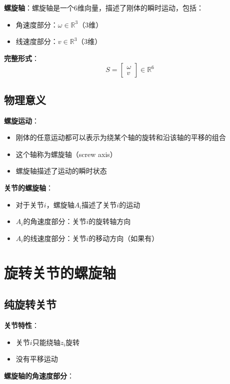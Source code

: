 \documentclass[12pt,a4paper]{article}
\begin{document}
\textbf{螺旋轴}：螺旋轴是一个6维向量，描述了刚体的瞬时运动，包括：
\begin{itemize}
\item 角速度部分：$\omega \in \mathbb{R}^3$（3维）
\item 线速度部分：$v \in \mathbb{R}^3$（3维）
\end{itemize}

\textbf{完整形式}：
\begin{equation}
S = \begin{bmatrix} \omega \\ v \end{bmatrix} \in \mathbb{R}^6
\end{equation}

\subsection{物理意义}

\textbf{螺旋运动}：
\begin{itemize}
\item 刚体的任意运动都可以表示为绕某个轴的旋转和沿该轴的平移的组合
\item 这个轴称为螺旋轴（screw axis）
\item 螺旋轴描述了运动的瞬时状态
\end{itemize}

\textbf{关节的螺旋轴}：
\begin{itemize}
\item 对于关节$i$，螺旋轴$A_i$描述了关节$i$的运动
\item $A_i$的角速度部分：关节$i$的旋转轴方向
\item $A_i$的线速度部分：关节$i$的移动方向（如果有）
\end{itemize}

\section{旋转关节的螺旋轴}

\subsection{纯旋转关节}

\textbf{关节特性}：
\begin{itemize}
\item 关节$i$只能绕轴$z_i$旋转
\item 没有平移运动
\end{itemize}

\textbf{螺旋轴的角速度部分}：
\end{document}

